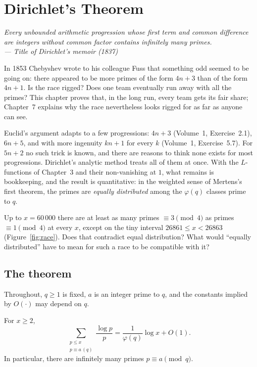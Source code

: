\chapter{Dirichlet's Theorem}

\begin{center}\itshape
Every unbounded arithmetic progression whose first term and common difference are integers without common factor
contains infinitely many primes.\\
\upshape --- Title of Dirichlet's memoir (1837)
\end{center}

In 1853 Chebyshev wrote to his colleague Fuss that something odd seemed to be going on: there appeared to be more primes of the form $4n+3$ than of
the form $4n+1$. Is the race rigged? Does one team eventually run away with all the primes? This chapter proves that, in the long run, every
team gets its fair share; Chapter~7 explains why the race nevertheless looks rigged for as far as anyone can see.

Euclid's argument adapts to a few progressions: $4n+3$ (Volume~1, Exercise~2.1), $6n+5$, and with more ingenuity $kn+1$ for every $k$
(Volume~1, Exercise~5.7). For $5n+2$ no such trick is known, and there are reasons to think none exists for most progressions. Dirichlet's
analytic method treats all of them at once. With the $L$-functions of Chapter~3 and their non-vanishing at $1$, what remains is
bookkeeping, and the result is quantitative: in the weighted sense of Mertens's first theorem, the primes are \emph{equally
distributed} among the $\varphi(q)$ classes prime to $q$.

\begin{think}
Up to $x=60\,000$ there are at least as many primes $\equiv3\pmod4$ as primes $\equiv1\pmod4$ at every $x$, except on the tiny interval $26861\le x<26863$ (Figure~\ref{fig:race}). Does that
contradict equal distribution? What would ``equally distributed'' have to mean for such a race to be compatible with it?
\end{think}

\section{The theorem}

Throughout, $q\ge1$ is fixed, $a$ is an integer prime to $q$, and the constants implied by $O(\cdot)$ may depend on $q$.

\begin{theorem}[Dirichlet, 1837]\label{thm:dirichlet}
For $x\ge2$,
\[
\sum_{\substack{p\le x\\p\equiv a\,(q)}}\frac{\log p}p=\frac1{\varphi(q)}\log x+O(1).
\]
In particular, there are infinitely many primes $p\equiv a\pmod q$.
\end{theorem}

